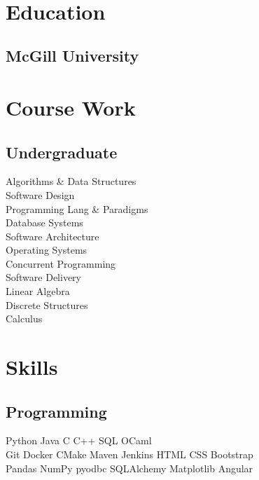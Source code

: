 \documentclass[]{willguthrie-resume}
\begin{document}
 
\header

\noindent\makebox[\linewidth]{\rule{0.94\paperwidth}{0.4pt}}

\hspace*{-\parindent}%
\begin{minipage}[t][][b]{0.33\textwidth}~

	\section{Education}
	\subsection{McGill University}
	\sectionsep

	\section{Course Work}
	\subsection{Undergraduate}
	Algorithms \& Data Structures \\
	Software Design \\
	Programming Lang \& Paradigms \\
	Database Systems \\
	Software Architecture \\
	Operating Systems \\
	Concurrent Programming \\
	Software Delivery \\
	Linear Algebra \\
	Discrete Structures \\
	Calculus \\
	\sectionsep

	\section{Skills}
	\subsection{Programming}
	Python \tb Java \tb C \tb C++ \tb SQL \tb OCaml \\
	Git \tb Docker \tb CMake \tb Maven \tb Jenkins \tb HTML \tb CSS \tb Bootstrap \\
	Pandas \tb NumPy \tb pyodbc \tb SQLAlchemy \tb Matplotlib \tb Angular \\
	\sectionsep


\end{minipage}
\end{document}
